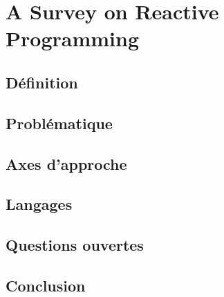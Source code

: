 \documentclass[11pt,twocolumn]{article}
\begin{document}
\section*{A Survey on Reactive Programming}

\subsection*{Définition}

\subsection*{Problématique}

\subsection*{Axes d'approche}

\subsection*{Langages}

\subsection*{Questions ouvertes}

\subsection*{Conclusion}
\end{document}
